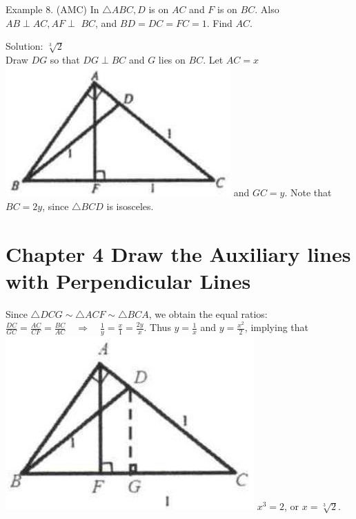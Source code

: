 \documentclass[10pt]{article}
\begin{document}
Example 8. (AMC) In \(\triangle A B C, D\) is on \(A C\) and \(F\) is on \(B C\). Also \(A B \perp A C, A F \perp\) \(B C\), and \(B D=D C=F C=1\). Find \(A C\).

Solution: \(\sqrt[3]{2}\)\\
Draw \(D G\) so that \(D G \perp B C\) and \(G\) lies on \(B C\). Let \(A C=x\)\\
\includegraphics[max width=\textwidth]{2025_04_17_97bc1f7e44d93c271a88g-079(3)} and \(G C=y\). Note that \(B C=2 y\), since \(\triangle B C D\) is isosceles.

\section*{Chapter 4 Draw the Auxiliary lines with Perpendicular Lines}
Since \(\triangle D C G \sim \triangle A C F \sim \triangle B C A\), we obtain the equal ratios: \(\frac{D C}{G C}=\frac{A C}{C F}=\frac{B C}{A C} \quad \Rightarrow \quad \frac{1}{y}=\frac{x}{1}=\frac{2 y}{x}\). Thus \(y=\frac{1}{x}\) and \(y=\frac{x^{2}}{2}\), implying that\\
\includegraphics[max width=\textwidth]{2025_04_17_97bc1f7e44d93c271a88g-080(2)} \(x^{3}=2\), or \(x=\sqrt[3]{2}\).
\end{document}
